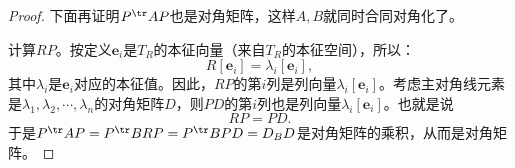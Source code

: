 \documentclass[12pt,UTF8]{ctexbook}
\begin{document}
\begin{appendix}
\begin{proof}
    下面再证明$P^{\tr}AP$也是对角矩阵，这样$A,B$就同时合同对角化了。

    计算$RP$。按定义$\mathbf{e}_i$是$T_R$的本征向量（来自$T_R$的本征空间），所以：
    $$ R[\mathbf{e}_i] = \lambda_i [\mathbf{e}_i],$$
    其中$\lambda_i$是$\mathbf{e}_i$对应的本征值。因此，$RP$的第$i$列是列向量$\lambda_i [\mathbf{e}_i]$。考虑主对角线元素是$\lambda_1,\lambda_2, \cdots, \lambda_n$的对角矩阵$D$，则$PD$的第$i$列也是列向量$\lambda_i [\mathbf{e}_i]$。也就是说
    $$ RP = PD. $$
    于是$ P^{\tr}AP = P^{\tr}BRP = P^{\tr}BPD = D_BD$是对角矩阵的乘积，从而是对角矩阵。
\end{proof}

\end{appendix}

\end{document}

